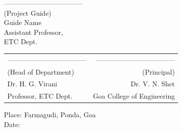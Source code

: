 \noindent -----------------------------------\\
(Project Guide)\\
Guide Name\\
Assistant Professor,\\
ETC Dept.\\



\begin{table}[H]
\begin{tabular}{lr}
\noindent ----------------------------------- & \hspace{6cm} ----------------------------------- \\
(Head of Department) & (Principal)\\
Dr. H. G. Virani & Dr. V. N. Shet\\
Professor, ETC Dept. & Goa College of Engineering\\
\end{tabular}
\end{table}
\vspace{-0.5cm}
\noindent Place: Farmagudi, Ponda, Goa\\
\noindent Date: 